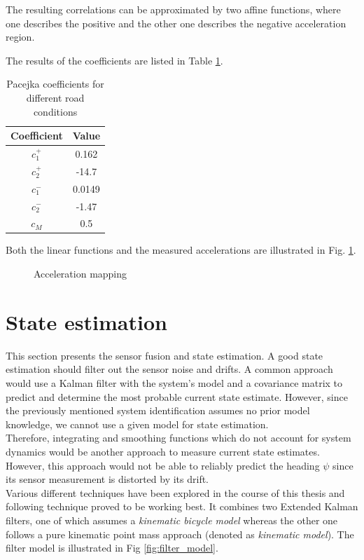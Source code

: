 The resulting correlations can be approximated by two affine functions, where one describes the positive and the other one describes the negative acceleration region.

The results of the coefficients are listed in Table \ref{tab:v_mapping}.
\begin{table}[h!]
\centering
\caption{Pacejka coefficients for different road conditions}
\begin{tabular}{c|c}
Coefficient & Value\\
\hline
$c_1^+$ & 0.162\\
$c_2^+$ & -14.7\\
$c_1^-$ & 0.0149\\
$c_2^-$ & -1.47\\
$c_M$ & 0.5
\end{tabular}
\label{tab:v_mapping}
\end{table}

Both the linear functions and the measured accelerations are illustrated in Fig. \ref{fig:v_over_u}.

\begin{figure}[ht]
    \centering
      
    \caption{Acceleration mapping}
    \label{fig:v_over_u}
\end{figure}

\section{State estimation}\label{sec:stateEstimation}
This section presents the sensor fusion and state estimation. A good state estimation should filter out the sensor noise and drifts. A common approach would use a Kalman filter with the system's model and a covariance matrix to predict and determine the most probable current state estimate. However, since the previously mentioned system identification assumes no prior model knowledge, we cannot use a given model for state estimation.\\
Therefore, integrating and smoothing functions which do not account for system dynamics would be another approach to measure current state estimates. However, this approach would not be able to reliably predict the heading $\psi$ since its sensor measurement is distorted by its drift.\\
Various different techniques have been explored in the course of this thesis and following technique proved to be working best. It combines two Extended Kalman filters, one of which assumes a \emph{kinematic bicycle model} whereas the other one follows a pure kinematic point mass approach (denoted as \emph{kinematic model}). The filter model is illustrated in Fig \ref{fig:filter_model}.

